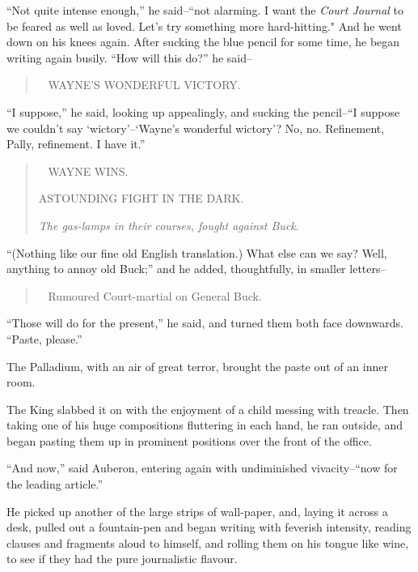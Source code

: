\documentclass{book}
\newenvironment{mdblockquote}{%
  \begin{quotation}
    \
}{%
  \end{quotation}
}
\begin{document}
“Not quite intense enough,” he said–“not alarming. I want the \emph{Court Journal} to be feared as well as loved. Let’s try something more hard-hitting." And he went down on his knees again. After sucking the blue pencil for some time, he began writing again busily. “How will this do?” he said–

\begin{mdblockquote}
	WAYNE’S WONDERFUL VICTORY.


\end{mdblockquote}
“I suppose,” he said, looking up appealingly, and sucking the pencil–“I suppose we couldn’t say ‘wictory’–‘Wayne’s wonderful wictory’? No, no. Refinement, Pally, refinement. I have it.”

\begin{mdblockquote}
	WAYNE WINS.

	ASTOUNDING FIGHT IN THE DARK.

	\emph{The gas-lamps in their courses, fought against Buck}.


\end{mdblockquote}
“(Nothing like our fine old English translation.) What else can we say? Well, anything to annoy old Buck;” and he added, thoughtfully, in smaller letters–

\begin{mdblockquote}
	Rumoured Court-martial on General Buck.


\end{mdblockquote}
“Those will do for the present,” he said, and turned them both face downwards. “Paste, please.”

The Palladium, with an air of great terror, brought the paste out of an inner room.

The King slabbed it on with the enjoyment of a child messing with treacle. Then taking one of his huge compositions fluttering in each hand, he ran outside, and began pasting them up in prominent positions over the front of the office.

“And now,” said Auberon, entering again with undiminished vivacity–“now for the leading article.”

He picked up another of the large strips of wall-paper, and, laying it across a desk, pulled out a fountain-pen and began writing with feverish intensity, reading clauses and fragments aloud to himself, and rolling them on his tongue like wine, to see if they had the pure journalistic flavour.
\end{document}
